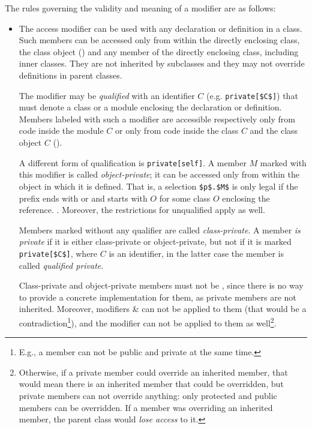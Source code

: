 The rules governing the validity and meaning of a modifier are as follows: 
\begin{itemize}
  \item The  access modifier can be used with any declaration or definition in a class. Such members can be accessed only from within the directly enclosing class, the class object () and any member of the directly enclosing class, including inner classes. They are not inherited by subclasses and they may not override definitions in parent classes. 

  The modifier may be {\em qualified} with an identifier $C$ (e.g. \lstinline!private[$C$]!) that must denote a class or a module enclosing the declaration or definition. Members labeled with such a modifier are accessible respectively only from code inside the module $C$ or only from code inside the class $C$ and the class object $C$ (). 

  A different form of qualification is \lstinline!private[self]!. A member $M$ marked with this modifier is called {\em object-private}; it can be accessed only from within the object in which it is defined. That is, a selection \lstinline!$p$.$M$! is only legal if the prefix ends with  or  and starts with $O$ for some class $O$ enclosing the reference. . Moreover, the restrictions for unqualified  apply as well. 

  Members marked  without any qualifier are called {\em class-private}. A member {\em is private} if it is either class-private or object-private, but not if it is marked \lstinline!private[$C$]!, where $C$ is an identifier, in the latter case the member is called {\em qualified private}. 

  Class-private and object-private members must not be , since there is no way to provide a concrete implementation for them, as private members are not inherited. Moreover, modifiers  \&  can not be applied to them (that would be a contradiction\footnote{E.g., a member can not be public and private at the same time.}), and the modifier  can not be applied to them as well\footnote{Otherwise, if a private member could override an inherited member, that would mean there is an inherited member that could be overridden, but private members can not override anything: only protected and public members can be overridden. If a member was overriding an inherited member, the parent class would {\em lose access} to it.}. 


\end{itemize}
